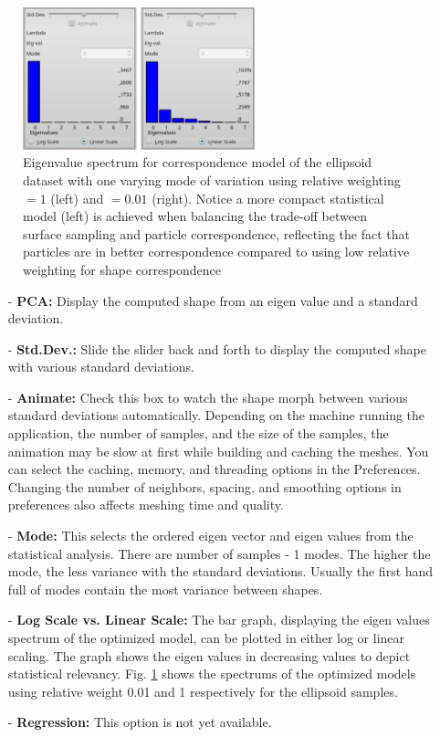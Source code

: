 \documentclass[letterpaper,12pt]{article}   %
\begin{document}
\clearpage


\begin{figure}[!htp]
	\centering
	\includegraphics[width=0.6\textwidth]{figs_v2/spectrums.png}
	\caption{Eigenvalue spectrum for correspondence model of the ellipsoid dataset with one varying mode of variation using relative weighting $= 1$ (left) and $ = 0.01$ (right). Notice a more compact statistical model (left) is achieved when balancing the trade-off between surface sampling and particle correspondence, reflecting the fact that particles are in better correspondence compared to using low relative weighting for shape correspondence }
	\label{fig:specturms}
\end{figure}

\begin{itemize}
	\item[-] \textbf{PCA:} Display the computed shape from an eigen value and a standard deviation.
	\item[-] \textbf{Std.Dev.:} Slide the slider back and forth to display the computed shape with various standard deviations.
	\item[-] \textbf{Animate:} Check this box to watch the shape morph between various standard deviations automatically. Depending on the machine running the application, the number of samples, and the size of the samples, the animation may be slow at first while building and caching the meshes. You can select the caching, memory, and threading options in the Preferences. Changing the number of neighbors, spacing, and smoothing options in preferences also affects meshing time and quality.
	
\item[-] \textbf{Mode:} This selects the ordered eigen vector and eigen values from the statistical analysis. There are number of samples - 1 modes. The higher the mode, the less variance with the standard deviations. Usually the first hand full of modes contain the most variance between shapes.

\item[-] \textbf{Log Scale vs. Linear Scale:} The bar graph, displaying the eigen values spectrum of the optimized model, can be plotted in either log or linear scaling. The graph shows the eigen values in decreasing values to depict statistical relevancy. Fig. \ref{fig:specturms} shows the spectrums of the optimized models using relative weight 0.01 and 1 respectively for the ellipsoid samples. 

\item[-] \textbf{Regression:} This option is not yet available.

\end{itemize}
\end{document}
